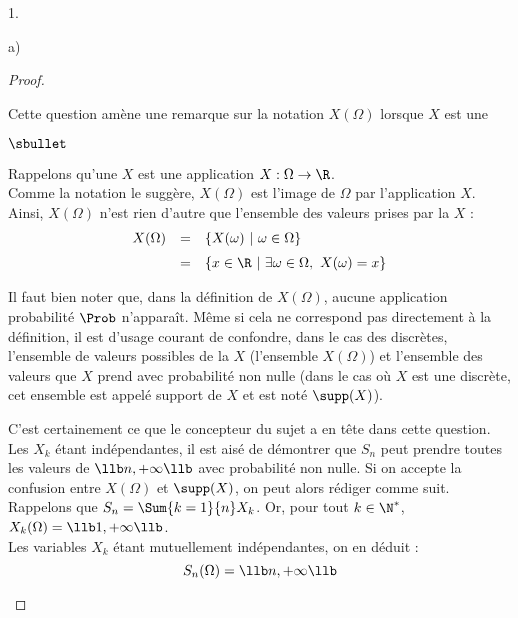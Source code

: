 \begin{noliste}{1.}
\begin{noliste}{a)}
\begin{proof}
      \begin{remark}%
        Cette question amène une remarque sur la notation $X(\Omega)$
        lorsque $X$ est une \var
        \begin{noliste}{$\sbullet$}
        \item Rappelons qu'une \var $X$ est une application $X :
          \Omega \to \R$.\\
          Comme la notation le suggère, $X(\Omega)$ est l'image de
          $\Omega$ par l'application $X$. \\
          Ainsi, $X(\Omega)$ n'est rien d'autre que l'ensemble des
          valeurs prises par la \var $X$ :
          \[
          \begin{array}{rcl}
            X(\Omega) & = & \{ X(\omega) \ | \ \omega \in \Omega\}
            \\[.2cm]
            & = & \{ x \in \R \ | \ \exists \omega \in \Omega, \ X(\omega) =
            x \}
          \end{array}
          \]
        \item Il faut bien noter que, dans la définition de
          $X(\Omega)$, aucune application probabilité $\Prob$
          n'apparaît. Même si cela ne correspond pas directement à la
          définition, il est d'usage courant de confondre, dans le cas
          des \var discrètes, l'ensemble de valeurs possibles de la
          \var $X$ (\ie l'ensemble $X(\Omega)$) et l'ensemble des
          valeurs que $X$ prend avec probabilité non nulle (dans le
          cas où $X$ est une \var discrète, cet ensemble est appelé
          support de $X$ et est noté $\supp(X)$).
        \item C'est certainement ce que le concepteur du sujet a en
          tête dans cette question. Les \var $X_k$ étant
          indépendantes, il est aisé de démontrer que $S_n$ peut
          prendre toutes les valeurs de $\llb n, +\infty \llb$ avec
          probabilité non nulle. Si on accepte la confusion entre
          $X(\Omega)$ et $\supp(X)$, on peut alors rédiger comme suit.\\[.1cm]
          Rappelons que $S_n = \Sum{k=1}{n} X_k$. Or, pour tout $k \in
          \N^*$, $X_k(\Omega) = \llb 1, +\infty \llb$.\\
          Les variables $X_k$ étant mutuellement indépendantes, on en
          déduit :
          \[
          S_n(\Omega) = \llb n, +\infty \llb
          \]

\end{noliste}
\end{remark}
\end{proof}
\end{noliste}
\end{noliste}

